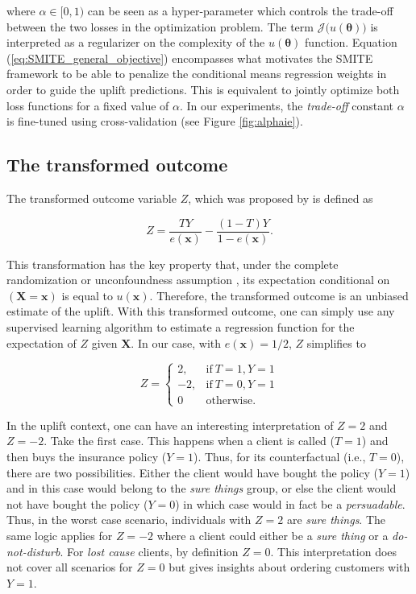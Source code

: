 \documentclass{article}
\def\X{\mathbf X}
\def\x{\mathbf x}
\begin{document}
where $\alpha \in [0,1)$ can be seen as a hyper-parameter which controls the trade-off between the two losses in the optimization problem. The term $\mathcal{J}\Big(u(\boldsymbol{\theta})\Big)$ is interpreted as a regularizer on the complexity of the $u(\boldsymbol{\theta})$ function. Equation (\ref{eq:SMITE_general_objective}) encompasses what motivates the SMITE framework to be able to penalize the conditional means regression weights in order to guide the uplift predictions. This is equivalent to jointly optimize both loss functions for a fixed value of $\alpha$. In our experiments, the {\it trade-off} constant $\alpha$ is fine-tuned using cross-validation (see Figure \ref{fig:alphaie}).


\subsection{The transformed outcome}

The transformed outcome variable $Z$, which was proposed by \citep{athey2015machine} is defined as  

\begin{equation}
    Z =  \frac{T Y}{e(\x)} - \frac{(1 - T) Y}{1 - e(\x)}.
    \label{eq:transformed_outcome}
\end{equation}

This transformation has the key property that, under the complete randomization or unconfoundness assumption \citep{rosenbaum1983central}, its expectation conditional on $(\X=\x)$ is equal to $u(\x)$. Therefore, the transformed outcome is an unbiased estimate of the uplift. With this transformed outcome, one can simply use any supervised learning algorithm to estimate a regression function for the expectation of $Z$ given $\X$. In our case, with $e(\x) = 1/2$, $Z$ simplifies to

\[ Z = \begin{cases} 
      2, & \mathrm{if}~T=1, Y=1 \\
      -2, & \mathrm{if}~T=0, Y=1 \\
      0 & \mathrm{otherwise.} 
   \end{cases}
\]

In the uplift context, one can have an interesting interpretation of $Z=2$ and $Z=-2$. Take the first case. This happens when a client is called ($T = 1$) and then buys the insurance policy ($Y = 1$). Thus, for its counterfactual (i.e., $T = 0$), there are two possibilities. Either the client would have bought the policy ($Y = 1$) and in this case would belong to the \textit{sure things} group, or else the client would not have bought the policy ($Y = 0$) in which case would in fact be a \textit{persuadable}. Thus, in the worst case scenario, individuals with $Z = 2$ are \textit{sure things}. The same logic applies for $Z = -2$ where a client could either be a \textit{sure thing} or a \textit{do-not-disturb}. For \textit{lost cause} clients, by definition $Z = 0$. This interpretation does not cover all scenarios for $Z=0$ but gives insights about ordering customers with $Y=1$. 
\end{document}
